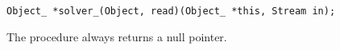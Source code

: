 
\tt{Object_ *solver_(Object, read)(Object_ *this, Stream in);}


The procedure always returns a null pointer.

